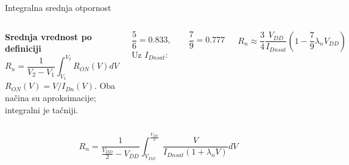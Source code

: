 \begin{frame}[label=09_1-s033]{Integralna srednja otpornost}\setlength{\parskip}{2pt}\setlength{\abovedisplayskip}{4pt}\setlength{\belowdisplayskip}{4pt}\setlength{\abovedisplayshortskip}{3pt}\setlength{\belowdisplayshortskip}{3pt}
\begin{columns}[T,onlytextwidth]\textbf{Srednja vrednost po definiciji}\[R_n=\frac1{V_2-V_1}\int_{V_1}^{V_2}R_{ON}(V)dV\]
$R_{ON}(V)=V/I_{Dn}(V)$.
Oba načina su aproksimacije; integralni je tačniji.\par\[\frac56=0.833,\qquad\frac79=0.777\]
Uz $I_{Dnsat}$:

\[R_n\approx\frac34\frac{V_{DD}}{I_{Dnsat}}\left(1-\frac79\lambda_nV_{DD}\right)\]
\end{columns}\[R_n=\frac1{\frac{V_{DD}}2-V_{DD}}\int_{V_{DD}}^{\frac{V_{DD}}2}\frac V{I_{Dnsat}(1+\lambda_nV)}dV\]

\end{frame}
